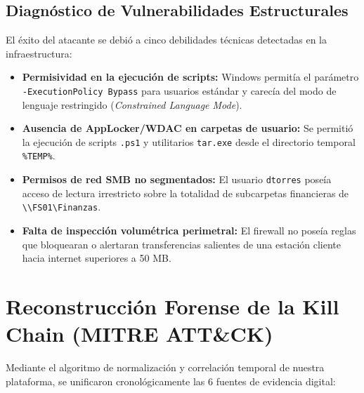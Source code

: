 \documentclass[11pt,a4paper]{article}
\begin{document}
\subsection{Diagnóstico de Vulnerabilidades Estructurales}
El éxito del atacante se debió a cinco debilidades técnicas detectadas en la infraestructura:
\begin{itemize}[noitemsep]
    \item \textbf{Permisividad en la ejecución de scripts:} Windows permitía el parámetro \texttt{-ExecutionPolicy Bypass} para usuarios estándar y carecía del modo de lenguaje restringido (\textit{Constrained Language Mode}).
    \item \textbf{Ausencia de AppLocker/WDAC en carpetas de usuario:} Se permitió la ejecución de scripts \texttt{.ps1} y utilitarios \texttt{tar.exe} desde el directorio temporal \texttt{\%TEMP\%}.
    \item \textbf{Permisos de red SMB no segmentados:} El usuario \texttt{dtorres} poseía acceso de lectura irrestricto sobre la totalidad de subcarpetas financieras de \texttt{\textbackslash\textbackslash FS01\textbackslash Finanzas}.
    \item \textbf{Falta de inspección volumétrica perimetral:} El firewall no poseía reglas que bloquearan o alertaran transferencias salientes de una estación cliente hacia internet superiores a 50 MB.
\end{itemize}

\section{Reconstrucción Forense de la Kill Chain (MITRE ATT\&CK)}

Mediante el algoritmo de normalización y correlación temporal de nuestra plataforma, se unificaron cronológicamente las 6 fuentes de evidencia digital:
\end{document}
